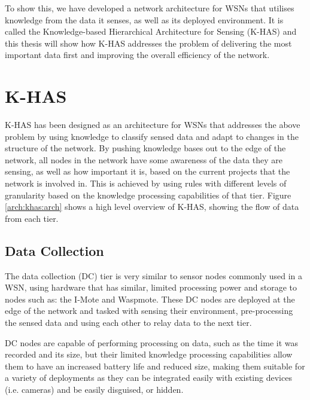 To show this, we have developed a network architecture for WSNs that utilises knowledge from the data it senses, as well as its deployed environment. It is called the Knowledge-based Hierarchical Architecture for Sensing (K-HAS)  and this thesis will show how K-HAS addresses the problem of delivering the most important data first and improving the overall efficiency of the network.


	
	\section{K-HAS}\label{arch:khas}
		K-HAS has been designed as an architecture for WSNs that addresses the above problem by using knowledge to classify sensed data and adapt to changes in the structure of the network. By pushing knowledge bases out to the edge of the network, all nodes in the network have some awareness of the data they are sensing, as well as how important it is, based on the current projects that the network is involved in. This is achieved by using rules with different levels of granularity based on the knowledge processing capabilities of that tier. Figure \ref{arch:khas:arch} shows a high level overview of K-HAS, showing the flow of data from each tier.
	
	
	\subsection{Data Collection}\label{khas:dc}
	The data collection (DC) tier is very similar to sensor nodes commonly used in a WSN, using hardware that has similar, limited processing power and storage to nodes such as: the I-Mote and Waspmote. These DC nodes are deployed at the edge of the network and tasked with sensing their environment, pre-processing the sensed data and using each other to relay data to the next tier.

	DC nodes are capable of performing processing on data, such as the time it was recorded and its size, but their limited knowledge processing capabilities allow them to have an increased battery life and reduced size, making them suitable for a variety of deployments as they can be integrated easily with existing devices (i.e. cameras) and be easily disguised, or hidden.

